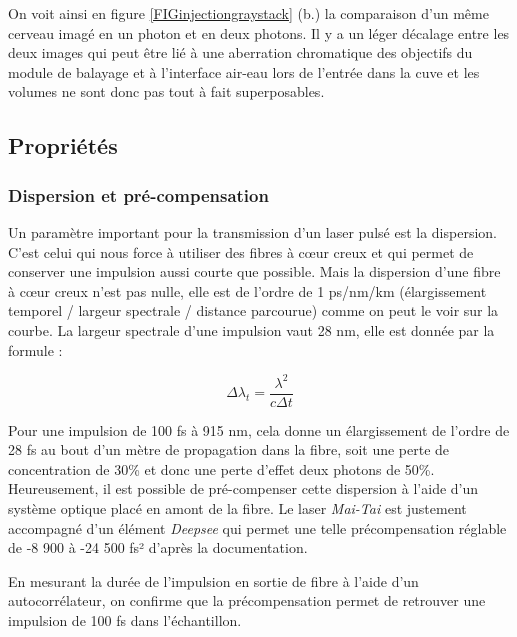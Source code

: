 On voit ainsi en figure \ref{FIGinjectiongraystack} (b.) la comparaison d'un même cerveau imagé en un photon et en deux photons. Il y a un léger décalage entre les deux images qui peut être lié à une aberration chromatique des objectifs du module de balayage et à l'interface air-eau lors de l'entrée dans la cuve et les volumes ne sont donc pas tout à fait superposables.


\subsection{Propriétés}


\subsubsection{Dispersion et pré-compensation}

Un paramètre important pour la transmission d'un laser pulsé est la dispersion. C'est celui qui nous force à utiliser des fibres à cœur creux et qui permet de conserver une impulsion aussi courte que possible. Mais la dispersion d'une fibre à cœur creux n'est pas nulle, elle est de l'ordre de 1 ps/nm/km (élargissement temporel / largeur spectrale / distance parcourue) comme on peut le voir sur la courbe. La largeur spectrale d'une impulsion vaut 28 nm, elle est donnée par la formule :

$$
\Delta \lambda_t = \frac{\lambda^2}{c\Delta t}
$$

Pour une impulsion de 100 fs à 915 nm, cela donne un élargissement de l'ordre de 28 fs au bout d'un mètre de propagation dans la fibre, soit une perte de concentration de 30\% et donc une perte d'effet deux photons de 50\%. Heureusement, il est possible de pré-compenser cette dispersion à l'aide d'un système optique placé en amont de la fibre. Le laser \emph{Mai-Tai} est justement accompagné d'un élément \emph{Deepsee} qui permet une telle précompensation réglable de -8 900 à -24 500 fs² d'après la documentation.


En mesurant la durée de l'impulsion en sortie de fibre à l'aide d'un autocorrélateur, on confirme que la précompensation permet de retrouver une impulsion de 100 fs dans l'échantillon.

